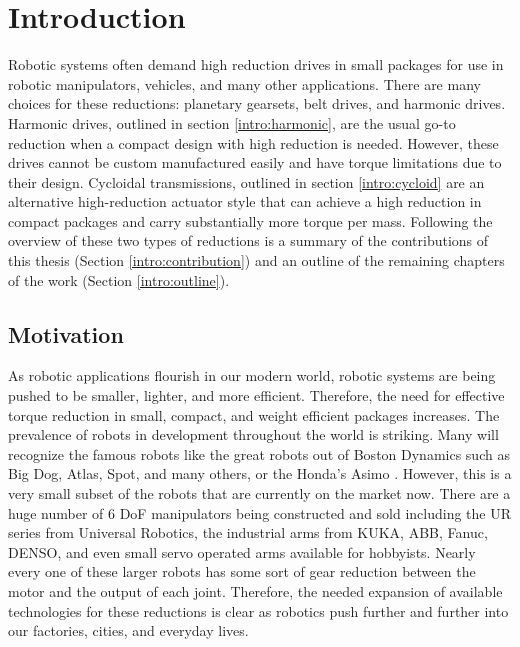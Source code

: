 
\chapter{Introduction}\label{ch:intro}
Robotic systems often demand high reduction drives in small packages for use in robotic manipulators, vehicles, and many other applications. There are many choices for these reductions: planetary gearsets, belt drives, and harmonic drives. Harmonic drives, outlined in section \ref{intro:harmonic}, are the usual go-to reduction when a compact design with high reduction is needed. However, these drives cannot be custom manufactured easily and have torque limitations due to their design. Cycloidal transmissions, outlined in section \ref{intro:cycloid} are an alternative high-reduction actuator style that can achieve a high reduction in compact packages and carry substantially more torque per mass. Following the overview of these two types of reductions is a summary of the contributions of this thesis (Section \ref{intro:contribution}) and an outline of the remaining chapters of the work (Section \ref{intro:outline}). 

\section{Motivation} \label{intro:motivation}

As robotic applications flourish in our modern world, robotic systems are being pushed to be smaller, lighter, and more efficient. 
Therefore, the need for effective torque reduction in small, compact, and weight efficient packages increases. 
The prevalence of robots in development throughout the world is striking. 
Many will recognize the famous robots like the great robots out of Boston Dynamics such as Big Dog, Atlas, Spot, and many others, or the Honda's Asimo \cite{ref:asimo}.
However, this is a very small subset of the robots that are currently on the market now. 
There are a huge number of 6 DoF manipulators being constructed and sold including the UR series from Universal Robotics, the industrial arms from KUKA, ABB, Fanuc, DENSO, and even small servo operated arms available for hobbyists. 
Nearly every one of these larger robots has some sort of gear reduction between the motor and the output of each joint. Therefore, the needed expansion of available technologies for these reductions is clear as robotics push further and further into our factories, cities, and everyday lives. 

